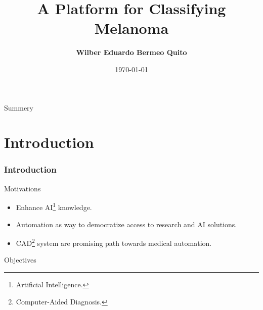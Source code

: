 \documentclass[dvipsnames,mathserif]{beamer}
\begin{document}
  \rightskip\rightmargin
  \title{A Platform for Classifying Melanoma}
  \author{ \Large \textbf{Wilber Eduardo Bermeo Quito} }
  \footnotesize{\date{\today }


    \begin{frame}
      \maketitle
    \end{frame}

    \begin{frame}{Summery}
      \footnotesize \tableofcontents

    \end{frame}

    \section{Introduction}


    \begin{frame}
      \frametitle{Introduction}
    \end{frame}


    \begin{frame}
      \large Motivations
      \vspace{0.25cm}

      \footnotesize
      \begin{itemize}
        \item Enhance AI\footnote{Artificial Intelligence.} knowledge.
        \item Automation as way to democratize access to research and AI solutions.
        \item CAD\footnote{Computer-Aided Diagnosis.} system are promising path
          towards medical automation.
      \end{itemize}
    \end{frame}


    \begin{frame}
      \large Objectives
      \vspace{0.25cm}


\end{frame}}
\end{document}
